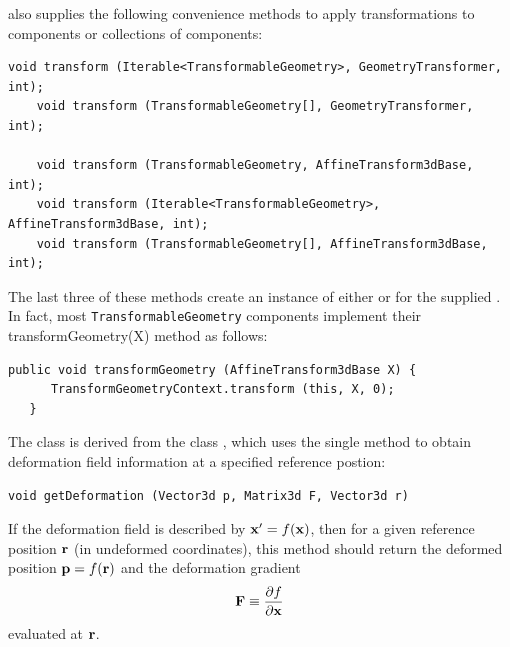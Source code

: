  also
supplies the following convenience methods to apply transformations to
components or collections of components:
%
\begin{lstlisting}[]
    void transform (Iterable<TransformableGeometry>, GeometryTransformer, int);
    void transform (TransformableGeometry[], GeometryTransformer, int);

    void transform (TransformableGeometry, AffineTransform3dBase, int);
    void transform (Iterable<TransformableGeometry>, AffineTransform3dBase, int);
    void transform (TransformableGeometry[], AffineTransform3dBase, int);
\end{lstlisting}
%
The last three of these methods create an instance of either
 or
 for the supplied
. In fact, most
{\tt TransformableGeometry} components implement their
%
{transformGeometry(X)} method as follows:
%
\begin{lstlisting}[]
   public void transformGeometry (AffineTransform3dBase X) {
      TransformGeometryContext.transform (this, X, 0);
   }
\end{lstlisting}
%

The 
class is derived from the
class , which uses
the single method
 to
obtain deformation field information at a specified reference postion:
%
\begin{lstlisting}[]
    void getDeformation (Vector3d p, Matrix3d F, Vector3d r)
\end{lstlisting}
%
If the deformation field is described by ${\bf x}' = f({\bf x})$, then
for a given reference position ${\bf r}$ (in undeformed coordinates),
this method should return the deformed position ${\bf p} = f({\bf r})$
and the deformation gradient
%
\begin{equation}
{\bf F} \equiv \frac{\partial f}{\partial {\bf x}}
\end{equation}
%
evaluated at ${\bf r}$. 

